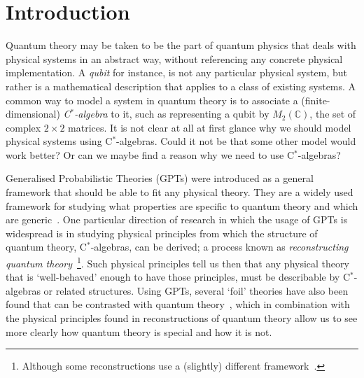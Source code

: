 \documentclass[b5paper,onecolumn,12pt,accepted=2019-05-03, issue=1, volume=1, shorttitle=papers/compositionality-1-1]{compositionalityarticle}
\numberwithin{counter}{section}
\newcommand{\C}{\mathbb{C}}
\begin{document}
\section{Introduction}
Quantum theory may be taken to be the part of quantum physics that deals with physical systems in an abstract way, without referencing any concrete physical implementation. A \emph{qubit} for instance, is not any particular physical system, but rather is a mathematical description that applies to a class of existing systems.
A common way to model a system in quantum theory is to associate a (finite-dimensional) \emph{C$^*$-algebra} to it, such as representing a qubit by $M_2(\C)$, the set of complex $2\times 2$ matrices. It is not clear at all at first glance why we should model physical systems using C$^*$-algebras. Could it not be that some other model would work better? Or can we maybe find a reason why we need to use C$^*$-algebras?

Generalised Probabilistic Theories (GPTs) were introduced as a general framework that should be able to fit any physical theory. They are a widely used framework for studying what properties are specific to quantum theory and which are generic~\cite{barrett2007information,barrett2017localstoch,chiribella2010probabilistic,barnum2007generalized,short2010entropy}. One particular direction of research in which the usage of GPTs is widespread is in studying physical principles from which the structure of quantum theory, C$^*$-algebras, can be derived; a process known as \emph{reconstructing quantum theory}~\cite{hardy2001quantum,masanes2011derivation,masanes2014entanglement,chiribella2011informational,dakic2009quantum,hardy2011reformulating,wilce2018royal,wetering2018sequential,gunson1967algebraic}\footnote{Although some reconstructions use a (slightly) different framework~\cite{barnum2014higher,selby2018reconstructing,tull2016reconstruction,fivel2012derivation,hohn2017toolbox,goyal2010information}.}. Such physical principles tell us then that any physical theory that is `well-behaved' enough to have those principles, must be describable by C$^*$-algebras or related structures.
Using GPTs, several `foil' theories have also been found that can be contrasted with quantum theory~\cite{spekkens2007toy,popescu2014nonlocality,chiribella2016purity,gogioso2017fantastic}, which in combination with the physical principles found in reconstructions of quantum theory allow us to see more clearly how quantum theory is special and how it is not.
\end{document}
